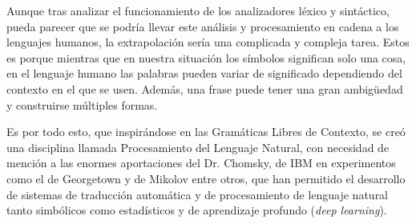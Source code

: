 \documentclass[a4paper,twocolumn]{article}
\begin{document}
    Aunque tras analizar el funcionamiento de los analizadores léxico y sintáctico, pueda parecer que se podría llevar este análisis y procesamiento en cadena a los lenguajes humanos, la extrapolación sería una complicada y compleja tarea.
    Estos es porque mientras que en nuestra situación los símbolos significan solo una cosa, en el lenguaje humano las palabras pueden variar de significado dependiendo del contexto en el que se usen.
    Además, una frase puede tener una gran ambigüedad y construirse múltiples formas.

    Es por todo esto, que inspirándose en las Gramáticas Libres de Contexto, se creó una disciplina llamada Procesamiento del Lenguaje Natural,
    con necesidad de mención a las enormes aportaciones del Dr. Chomsky\cite{cfg}, de IBM en experimentos como el de Georgetown\cite{IBMGeorgetown} y de Mikolov\cite{mikolov10_interspeech} entre otros,
    que han permitido el desarrollo de sistemas de traducción automática y de procesamiento de lenguaje natural tanto simbólicos como estadísticos y de aprendizaje profundo (\textit{deep learning}).

    \newpage






    

    

    \clearpage


    \makeatletter
    \newcommand\appendix@section[1]{%
        \refstepcounter{section}%
        \orig@section*{Apéndice \@Alph\c@section: #1}%
        \addcontentsline{toc}{section}{Apéndice \@Alph\c@section: #1}%
    }
    \let\orig@section\section
    \g@addto@macro\appendix{\let\section\appendix@section}
    \makeatother
\end{document}
